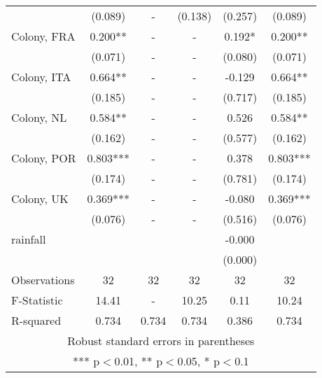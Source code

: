 \documentclass[12pt]{article}
\begin{document}
\begin{flushleft}
{\begin{tabular}{lccccc}
 & (0.089) & - & (0.138) & (0.257) & (0.089) \\
Colony, FRA & 0.200** & - & - & 0.192* & 0.200** \\
 & (0.071) & - & - & (0.080) & (0.071) \\
Colony, ITA & 0.664** & - & - & -0.129 & 0.664** \\
 & (0.185) & - & - & (0.717) & (0.185) \\
Colony, NL & 0.584** & - & - & 0.526 & 0.584** \\
 & (0.162) & - & - & (0.577) & (0.162) \\
Colony, POR & 0.803*** & - & - & 0.378 & 0.803*** \\
 & (0.174) & - & - & (0.781) & (0.174) \\
Colony, UK & 0.369*** & - & - & -0.080 & 0.369*** \\
 & (0.076) & - & - & (0.516) & (0.076) \\
rainfall &  &  &  & -0.000 &  \\
 &  &  &  & (0.000) &  \\
Observations & 32 & 32 & 32 & 32 & 32 \\
F-Statistic & 14.41 & - & 10.25 & 0.11 & 10.24 \\
 R-squared & 0.734 & 0.734 & 0.734 & 0.386 & 0.734 \\ \hline
\multicolumn{6}{c}{ Robust standard errors in parentheses} \\
\multicolumn{6}{c}{ *** p$<$0.01, ** p$<$0.05, * p$<$0.1} \\
\end{tabular}
}
\end{flushleft}

\setlength{\pdfpagewidth}{8.5in} 
\setlength{\pdfpageheight}{11in} 
\end{document}
